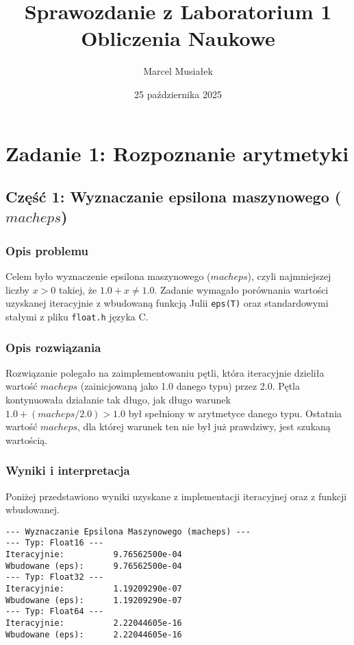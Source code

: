 \documentclass[12pt,a4paper]{article}
\title{Sprawozdanie z Laboratorium 1\\
\large Obliczenia Naukowe}
\author{Marcel Musiałek}
\date{25 października 2025}
\begin{document}
\maketitle
\thispagestyle{fancy} %

\section{Zadanie 1: Rozpoznanie arytmetyki}

\subsection{Część 1: Wyznaczanie epsilona maszynowego ($macheps$)}

\subsubsection{Opis problemu}
Celem było wyznaczenie epsilona maszynowego ($macheps$), czyli najmniejszej liczby $x > 0$ takiej, że $1.0 + x \neq 1.0$. Zadanie wymagało porównania wartości uzyskanej iteracyjnie z wbudowaną funkcją Julii \texttt{eps(T)} oraz standardowymi stałymi z pliku \texttt{float.h} języka C.

\subsubsection{Opis rozwiązania}
Rozwiązanie polegało na zaimplementowaniu pętli, która iteracyjnie dzieliła wartość $macheps$ (zainicjowaną jako 1.0 danego typu) przez 2.0. Pętla kontynuowała działanie tak długo, jak długo warunek $1.0 + (macheps / 2.0) > 1.0$ był spełniony w arytmetyce danego typu. Ostatnia wartość $macheps$, dla której warunek ten nie był już prawdziwy, jest szukaną wartością.

\subsubsection{Wyniki i interpretacja}
Poniżej przedstawiono wyniki uzyskane z implementacji iteracyjnej oraz z funkcji wbudowanej.
\begin{verbatim}
--- Wyznaczanie Epsilona Maszynowego (macheps) ---
--- Typ: Float16 ---
Iteracyjnie:          9.76562500e-04
Wbudowane (eps):      9.76562500e-04
--- Typ: Float32 ---
Iteracyjnie:          1.19209290e-07
Wbudowane (eps):      1.19209290e-07
--- Typ: Float64 ---
Iteracyjnie:          2.22044605e-16
Wbudowane (eps):      2.22044605e-16
\end{verbatim}
\end{document}

